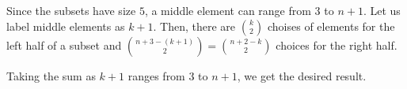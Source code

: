Since the subsets have size $5$, a middle element can range from $3$ to $n+1$. Let us label middle elements as $k+1$. Then, there are ${k \choose 2}$ choises of elements for the left half of a subset and ${n+3-(k+1) \choose 2} = {n+2-k \choose 2}$ choices for the right half.

Taking the sum as $k+1$ ranges from $3$ to $n+1$, we get the desired result.